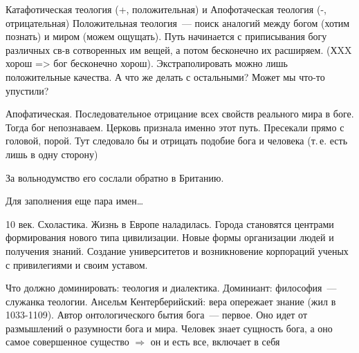 Катафотическая теология (+, положительная) и Апофотаческая теология (-, отрицательная) 
Положительная теология~--- поиск аналогий между богом (хотим познать) и миром (можем ощущать). Путь начинается с приписывания богу различных св-в сотворенных им вещей, а потом бесконечно их расширяем. (ХXX хорош => бог бесконечно хорош). Экстраполировать можно лишь положительные качества. А что же делать с остальными? Может мы что-то упустили?

Апофатическая. Последовательное отрицание всех свойств реального мира в боге. Тогда бог непознаваем. Церковь признала именно этот путь. Пресекали прямо с головой, порой. Тут следовало бы и отрицать подобие бога и человека (т.\,е. есть лишь в одну сторону) 

За вольнодумство его сослали обратно в Британию.

Для заполнения еще пара имен\ldots

10 век. Схоластика.
Жизнь в Европе наладилась. Города становятся центрами формирования нового типа цивилизации. Новые формы организации людей и получения знаний. Создание университетов и возникновение корпораций ученых с привилегиями и своим уставом.

Что должно доминировать: теология и диалектика.
Доминиант: философия~--- служанка теологии.
Ансельм Кентерберийский: вера опережает знание (жил в 1033-1109). Автор онтологического бытия бога~--- первое. Оно идет от размышлений о разумности бога и мира. Человек знает сущность бога, а оно самое совершенное существо $\Rightarrow$ он и есть все, включает в себя
